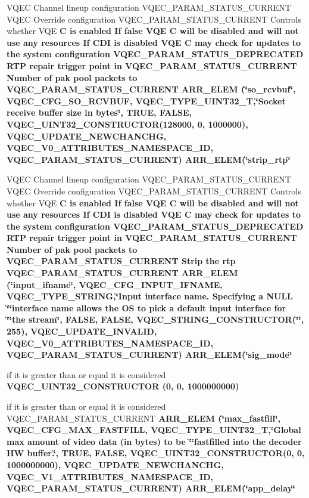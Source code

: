 \begin{CompactItemize}
\item 
VQEC Channel lineup configuration VQEC\_\-PARAM\_\-STATUS\_\-CURRENT VQEC Override configuration VQEC\_\-PARAM\_\-STATUS\_\-CURRENT Controls whether VQE \bf{C} is enabled If false VQE \bf{C} will be disabled and will not use any resources If CDI is disabled VQE \bf{C} may check for updates \bf{to} the system configuration VQEC\_\-PARAM\_\-STATUS\_\-DEPRECATED RTP repair trigger point in VQEC\_\-PARAM\_\-STATUS\_\-CURRENT Number of pak pool packets \bf{to} VQEC\_\-PARAM\_\-STATUS\_\-CURRENT \bf{ARR\_\-ELEM} (\char`\"{}so\_\-rcvbuf\char`\"{}, VQEC\_\-CFG\_\-SO\_\-RCVBUF, \bf{VQEC\_\-TYPE\_\-UINT32\_\-T},\char`\"{}Socket receive buffer size in bytes\char`\"{}, TRUE, \bf{FALSE}, VQEC\_\-UINT32\_\-CONSTRUCTOR(128000, 0, 1000000), \bf{VQEC\_\-UPDATE\_\-NEWCHANCHG}, \bf{VQEC\_\-V0\_\-ATTRIBUTES\_\-NAMESPACE\_\-ID}, VQEC\_\-PARAM\_\-STATUS\_\-CURRENT) ARR\_\-ELEM(\char`\"{}strip\_\-rtp\char`\"{}
\item 
VQEC Channel lineup configuration VQEC\_\-PARAM\_\-STATUS\_\-CURRENT VQEC Override configuration VQEC\_\-PARAM\_\-STATUS\_\-CURRENT Controls whether VQE \bf{C} is enabled If false VQE \bf{C} will be disabled and will not use any resources If CDI is disabled VQE \bf{C} may check for updates \bf{to} the system configuration VQEC\_\-PARAM\_\-STATUS\_\-DEPRECATED RTP repair trigger point in VQEC\_\-PARAM\_\-STATUS\_\-CURRENT Number of pak pool packets \bf{to} VQEC\_\-PARAM\_\-STATUS\_\-CURRENT Strip the rtp VQEC\_\-PARAM\_\-STATUS\_\-CURRENT \bf{ARR\_\-ELEM} (\char`\"{}input\_\-ifname\char`\"{}, VQEC\_\-CFG\_\-INPUT\_\-IFNAME, \bf{VQEC\_\-TYPE\_\-STRING},\char`\"{}Input interface name. Specifying a NULL \char`\"{}\char`\"{}interface name allows the OS \bf{to} pick a default input interface for \char`\"{}\char`\"{}the stream\char`\"{}, FALSE, \bf{FALSE}, VQEC\_\-STRING\_\-CONSTRUCTOR(\char`\"{}\char`\"{}, 255), \bf{VQEC\_\-UPDATE\_\-INVALID}, \bf{VQEC\_\-V0\_\-ATTRIBUTES\_\-NAMESPACE\_\-ID}, VQEC\_\-PARAM\_\-STATUS\_\-CURRENT) ARR\_\-ELEM(\char`\"{}sig\_\-mode\char`\"{}
\item 
if it is greater than or equal it is considered \bf{VQEC\_\-UINT32\_\-CONSTRUCTOR} (0, 0, 1000000000)
\item 
if it is greater than or equal it is considered VQEC\_\-PARAM\_\-STATUS\_\-CURRENT \bf{ARR\_\-ELEM} (\char`\"{}max\_\-fastfill\char`\"{}, VQEC\_\-CFG\_\-MAX\_\-FASTFILL, \bf{VQEC\_\-TYPE\_\-UINT32\_\-T},\char`\"{}Global max amount of video data (in bytes) \bf{to} be \char`\"{}\char`\"{}fastfilled into the decoder HW buffer.\char`\"{}, TRUE, \bf{FALSE}, VQEC\_\-UINT32\_\-CONSTRUCTOR(0, 0, 1000000000), \bf{VQEC\_\-UPDATE\_\-NEWCHANCHG}, \bf{VQEC\_\-V1\_\-ATTRIBUTES\_\-NAMESPACE\_\-ID}, VQEC\_\-PARAM\_\-STATUS\_\-CURRENT) ARR\_\-ELEM(\char`\"{}app\_\-delay\char`\"{}

\end{CompactItemize}
